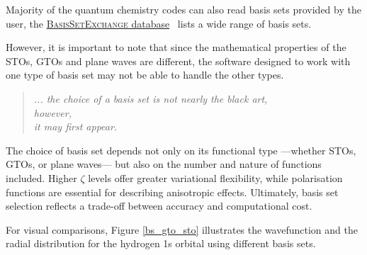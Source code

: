 Majority of the quantum chemistry codes can also read basis sets provided by
the user, the
\href{https://www.basissetexchange.org/}{\textsc{BasisSetExchange} database}~\cite{Pritchard2019}
lists a wide range of basis sets.

However, it is important to note that since the mathematical properties of the
\glspl{STO}, \glspl{GTO} and plane waves are different, the software designed
to work with one type of basis set may not be able to handle the other types.

\begin{quote}
  \textit{... the choice of a basis set is not nearly the black art,\\
  \hspace*{0.57\textwidth}\makebox[0pt][r] however,\\
  \hspace*{0.61\textwidth}\makebox[0pt][r] it may first appear.}
  \begin{flushright}
    \citet{szabo}
  \end{flushright}
\end{quote}

The choice of basis set depends not only on its functional type ---whether
\glspl{STO}, \glspl{GTO}, or plane waves--- but also on the number and nature of
functions included. Higher $\zeta$ levels offer greater variational flexibility,
while polarisation functions are essential for describing anisotropic effects.
Ultimately, basis set selection reflects a trade-off between accuracy and
computational cost.

\newpage
\vspace{5cm}
For visual comparisons, Figure \ref{bs_gto_sto} illustrates the wavefunction
and the radial distribution for the hydrogen 1s orbital using different basis
sets.

